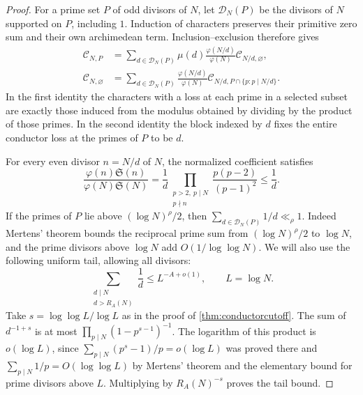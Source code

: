 \documentclass[11pt,a4paper]{article}
\numberwithin{equation}{section}
\newcommand{\SSS}{\mathfrak S}
\begin{document}
\begin{proof}
For a prime set $P$ of odd divisors of $N$, let
$\mathcal D_N(P)$ be the divisors of $N$ supported on $P$,
including $1$. Induction of characters preserves their
primitive zero sum and their own archimedean term.
Inclusion--exclusion therefore gives
\begin{align}
 \mathcal C_{N,P}
   &=\sum_{d\in\mathcal D_N(P)}
         \mu(d)\frac{\varphi(N/d)}{\varphi(N)}
                       \mathcal C_{N/d,\varnothing}, \label{eq:largeprimeinvert}\\
 \mathcal C_{N,\varnothing}
   &=\sum_{d\in\mathcal D_N(P)}
        \frac{\varphi(N/d)}{\varphi(N)}
                   \mathcal C_{N/d,P\cap\{p:p\mid N/d\}} .
 \label{eq:largeprimereassemble}
\end{align}
In the first identity the characters with a loss at each prime
in a selected subset are exactly those induced from the modulus
obtained by dividing by the product of those primes. In the
second identity the block indexed by $d$ fixes the entire
conductor loss at the primes of $P$ to be $d$.

For every even divisor $n=N/d$ of $N$, the normalized
coefficient satisfies
\begin{equation}
 \frac{\varphi(n)\SSS(n)}{\varphi(N)\SSS(N)}
     =\frac1d
       \prod_{\substack{p>2,\ p\mid N\\p\nmid n}}
           \frac{p(p-2)}{(p-1)^2}
     \le\frac1d .
 \label{eq:largeprimenormalization}
\end{equation}
If the primes of $P$ lie above $(\log N)^\rho/2$,
then $\sum_{d\in\mathcal D_N(P)}1/d\ll_\rho1$.
Indeed Mertens' theorem bounds the reciprocal prime
sum from $(\log N)^\rho/2$ to $\log N$, and the prime
divisors above $\log N$ add $O(1/\log\log N)$.
We will also use the following uniform tail, allowing
all divisors:
\begin{equation}
  \sum_{\substack{d\mid N\\d>R_A(N)}}\frac1d
                     \le L^{-A+o(1)},\qquad L=\log N.
 \label{eq:largeprimedivisortail}
\end{equation}
Take $s=\log\log L/\log L$ as in the proof of
\cref{thm:conductorcutoff}. The sum of $d^{-1+s}$ is at most
$\prod_{p\mid N}(1-p^{s-1})^{-1}$. The logarithm of this
product is $o(\log L)$, since
$\sum_{p\mid N}(p^s-1)/p=o(\log L)$ was proved there and
$\sum_{p\mid N}1/p=O(\log\log L)$ by Mertens' theorem and
the elementary bound for prime divisors above $L$.
Multiplying by $R_A(N)^{-s}$ proves the tail bound.


\end{proof}
\end{document}
